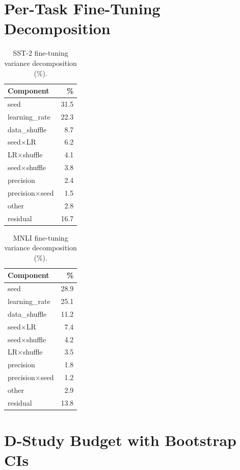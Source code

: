 \documentclass[11pt,letterpaper]{article}
\begin{document}
\appendix

\section{Per-Task Fine-Tuning Decomposition}

\begin{table}[h]
\centering
\caption{SST-2 fine-tuning variance decomposition (\%).}
\label{tab:sst2_detail}
\small
\begin{tabular}{@{}lr@{}}
\toprule
Component & \% \\
\midrule
seed & 31.5 \\
learning\_rate & 22.3 \\
data\_shuffle & 8.7 \\
seed$\times$LR & 6.2 \\
LR$\times$shuffle & 4.1 \\
seed$\times$shuffle & 3.8 \\
precision & 2.4 \\
precision$\times$seed & 1.5 \\
other & 2.8 \\
residual & 16.7 \\
\bottomrule
\end{tabular}
\end{table}

\begin{table}[h]
\centering
\caption{MNLI fine-tuning variance decomposition (\%).}
\label{tab:mnli_detail}
\small
\begin{tabular}{@{}lr@{}}
\toprule
Component & \% \\
\midrule
seed & 28.9 \\
learning\_rate & 25.1 \\
data\_shuffle & 11.2 \\
seed$\times$LR & 7.4 \\
seed$\times$shuffle & 4.2 \\
LR$\times$shuffle & 3.5 \\
precision & 1.8 \\
precision$\times$seed & 1.2 \\
other & 2.9 \\
residual & 13.8 \\
\bottomrule
\end{tabular}
\end{table}

\section{D-Study Budget with Bootstrap CIs}
\end{document}
